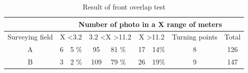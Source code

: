 \begin{table}[H]
\centering
\begin{tabular}{|c|c|l|c|l|c|l|c|c|}
\hline
 & \multicolumn{8}{c|}{Number of photo in a X range of meters}                                                                                                                            \\ \hline
Surveying field         & \multicolumn{2}{c|}{X \textless 3.2} & \multicolumn{2}{c|}{3.2 \textless X \textgreater 11.2} & \multicolumn{2}{c|}{X \textgreater 11.2} & Turning points & Total                      \\ \hline
A                       & 6               & 5 \%               & 95                        & 81 \%                      & 17                 & 14\%                & 8              & 126                        \\ \hline
B                       & 3               & 2 \%                & 109                       & 79 \%                      & 26                 & 19\%                & 9              &  147 \\ \hline
\end{tabular}
\caption{Result of front overlap test}
\label{Table:FrontOverlap} 
\end{table}
